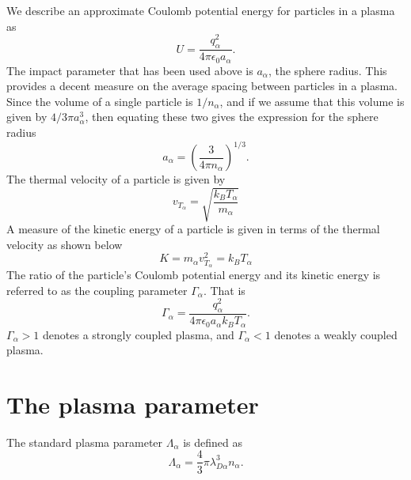 \documentclass[a4paper,11pt]{report}
\begin{document}
We describe an approximate Coulomb potential energy for particles in a plasma as
\begin{equation}
    U =  \frac{q_\alpha^2}{4 \pi \epsilon_0 a_\alpha}.
\end{equation}
The impact parameter that has been used above is $a_\alpha$, the sphere radius. This provides a decent measure on the average spacing between particles in a plasma. Since the volume of a single particle is $1/n_\alpha$, and if we assume that this volume is given by $4/3 \pi a_\alpha^3$, then equating these two gives the expression for the sphere radius
\begin{equation}
    a_\alpha = \left ( \frac{3}{4 \pi n_\alpha} \right )^{1/3}.
\end{equation}
The thermal velocity of a particle is given by
\begin{equation}
    v_{T_\alpha} = \sqrt{\frac{k_B T_\alpha}{m_\alpha}}
\end{equation}
A measure of the kinetic energy of a particle is given in terms of the thermal velocity as shown below
\begin{equation}
    K = m_\alpha v_{T_\alpha}^2 = k_B T_\alpha
\end{equation}
The ratio of the particle's Coulomb potential energy and its kinetic energy is referred to as the coupling parameter $\Gamma_\alpha$. That is 
\begin{equation}
    \Gamma_\alpha = \frac{q_\alpha^2}{4 \pi \epsilon_0 a_\alpha k_B T_\alpha}.
\end{equation}
$\Gamma_\alpha > 1$ denotes a strongly coupled plasma, and $\Gamma_\alpha < 1$ denotes a weakly coupled plasma. 

\section{The plasma parameter}
The standard plasma parameter $\Lambda_\alpha$ is defined as
\begin{equation}
    \Lambda_\alpha = \frac{4}{3} \pi \lambda_{D\alpha}^3 n_\alpha.
\end{equation}
\end{document}
